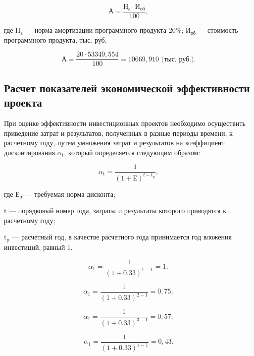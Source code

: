 \begin{equation}
  \text{А} = \frac{\text{Н}_{\text{а}}\cdot\text{И}_{\text{об}}}{100},
\end{equation}

где \(\text{Н}_{\text{а}}\) --- норма амортизации программного продукта 20\%;
\(\text{И}_{\text{об}}\) --- стоимость программного продукта, тыс. руб.

\begin{equation}
  \text{А} = \frac{20\cdot53349,554}{100} = 10669,910 \text{ (тыс. руб.)}.
\end{equation}

\subsection{Расчет показателей экономической эффективности проекта}

При оценке эффективности инвестиционных проектов необходимо осуществить приведение затрат и результатов, полученных в разные периоды времени, к  расчетному году,  путем умножения затрат и результатов на коэффициент дисконтирования \(\alpha_{\text{t}}\), который определяется следующим образом:

\begin{equation}
  \alpha_{\text{t}} = \frac{1}{(1+\text{Е})^{t-\text{t}_{\text{p}}}},
\end{equation}

где \(\text{Е}_{\text{н}}\) --- требуемая норма дисконта;  

\(\text{t}\) --- порядковый номер года, затраты и результаты которого приводятся к расчетному году;

\(\text{t}_{\text{p}}\) --- расчетный год, в качестве расчетного года принимается год вложения инвестиций, равный 1.

\begin{equation}
  \alpha_{\text{1}} = \frac{1}{(1+0.33)^{1-1}} = 1;
\end{equation}

\begin{equation}
  \alpha_{\text{1}} = \frac{1}{(1+0.33)^{2-1}} = 0,75;
\end{equation}

\begin{equation}
  \alpha_{\text{1}} = \frac{1}{(1+0.33)^{3-1}} = 0,57;
\end{equation}

\begin{equation}
  \alpha_{\text{1}} = \frac{1}{(1+0.33)^{4-1}} = 0,43.
\end{equation}

